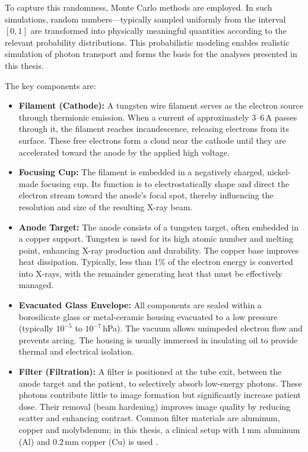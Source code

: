 To capture this randomness, Monte Carlo methods
are employed. In such simulations, random numbers—typically sampled uniformly
from the interval $[0,1]$ are transformed into physically meaningful
quantities according to the relevant probability distributions. This
probabilistic modeling enables realistic simulation of photon transport and
forms the basis for the analyses presented in this thesis.

The key components are:

\begin{itemize}
    \item \textbf{Filament (Cathode):} A tungsten wire filament serves as the
    electron source through thermionic emission. When a current of approximately
    3--6\,A passes through it, the filament reaches incandescence, releasing
    electrons from its surface. These free electrons form a cloud near the
    cathode until they are accelerated toward the anode by the applied high
    voltage.

    \item \textbf{Focusing Cup:} The filament is embedded in a negatively
    charged, nickel-made focusing cup. Its function is to electrostatically
    shape and direct the electron stream toward the anode's focal spot, thereby
    influencing the resolution and size of the resulting X-ray beam.

    \item \textbf{Anode Target:} The anode consists of a tungsten target, often
    embedded in a copper support. Tungsten is used for its high atomic number
    and melting point, enhancing X-ray production and durability. The copper
    base improves heat dissipation. Typically, less than 1\% of the electron
    energy is converted into X-rays, with the remainder generating heat that
    must be effectively managed.

    \item \textbf{Evacuated Glass Envelope:} All components are sealed within a
    borosilicate glass or metal-ceramic housing evacuated to a low pressure
    (typically $10^{-5}$ to $10^{-7}$\,hPa). The vacuum allows unimpeded
    electron flow and prevents arcing. The housing is usually immersed in
    insulating oil to provide thermal and electrical isolation.

    \item \textbf{Filter (Filtration):} A filter is positioned at the tube exit,
    between the anode target and the patient, to selectively absorb low-energy
    photons. These photons contribute little to image formation but
    significantly increase patient dose. Their removal (beam hardening) improves
    image quality by reducing scatter and enhancing contrast. Common filter
    materials are aluminum, copper and molybdenum; in this thesis, a clinical
    setup with $1$\,mm aluminum (Al) and $0.2$\,mm copper (Cu) is used
    \cite{poludniowski2022calculating,steidel2022dose}.
\end{itemize}

